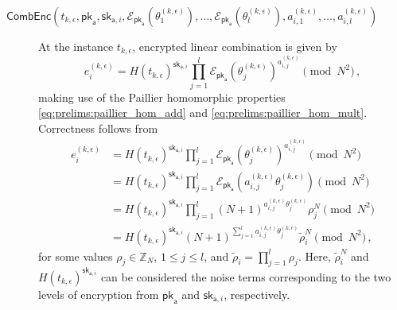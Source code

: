 \begin{description}
    \item[$\mathsf{CombEnc}(t_{k,\epsilon}, \mathsf{pk}_{\mathsf{a}}, \mathsf{sk}_{\mathsf{a},i}, \mathcal{E}_{\mathsf{pk}_{\mathsf{a}}}(\theta_1^{(k,\epsilon)}),\dots,\mathcal{E}_{\mathsf{pk}_{\mathsf{a}}}(\theta_l^{(k,\epsilon)}), a^{(k,\epsilon)}_{i,1},\dots,a^{(k,\epsilon)}_{i,l})$] At the instance $t_{k,\epsilon}$, encrypted linear combination is given by 
    \begin{equation}\label{eq:nonlin_fusion:lca_scheme_lin_comb}
        e^{(k,\epsilon)}_i = H(t_{k,\epsilon})^{\mathsf{sk}_{\mathsf{a},i}}\prod^{l}_{j=1}\mathcal{E}_{\mathsf{pk}_{\mathsf{a}}}(\theta^{(k,\epsilon)}_j)^{a^{(k,\epsilon)}_{i,j}} \pmod{N^2}\,,
    \end{equation}
    making use of the Paillier homomorphic properties \eqref{eq:prelims:paillier_hom_add} and \eqref{eq:prelims:paillier_hom_mult}. Correctness follows from
    \begin{equation*}
        \begin{split}
            e^{(k,\epsilon)}_i &= H(t_{k,\epsilon})^{\mathsf{sk}_{\mathsf{a},i}}\prod^{l}_{j=1}\mathcal{E}_{\mathsf{pk}_{\mathsf{a}}}(\theta^{(k,\epsilon)}_j)^{a^{(k,\epsilon)}_{i,j}} \pmod{N^2} \\
            &= H(t_{k,\epsilon})^{\mathsf{sk}_{\mathsf{a},i}}\prod^{l}_{j=1}\mathcal{E}_{\mathsf{pk}_{\mathsf{a}}}(a^{(k,\epsilon)}_{i,j}\theta^{(k,\epsilon)}_j) \pmod{N^2} \\
            &= H(t_{k,\epsilon})^{\mathsf{sk}_{\mathsf{a},i}}\prod^{l}_{j=1}(N+1)^{a^{(k,\epsilon)}_{i,j}\theta^{(k,\epsilon)}_j} \rho^{N}_{j} \pmod{N^2} \\
            &= H(t_{k,\epsilon})^{\mathsf{sk}_{\mathsf{a},i}}(N+1)^{\sum^{l}_{j=1}a^{(k,\epsilon)}_{i,j}\theta^{(k,\epsilon)}_j} \tilde{\rho}_{i}^{N} \pmod{N^2}\,,
        \end{split}
    \end{equation*}
    for some values $\rho_j \in \mathbb{Z}_N$, $1\leq j\leq l$, and $\tilde{\rho}_i=\prod^{l}_{j=1}\rho_j$. Here, $\tilde{\rho}_i^N$ and $H(t_{k,\epsilon})^{\mathsf{sk}_{\mathsf{a}, i}}$ can be considered the noise terms corresponding to the two levels of encryption from $\mathsf{pk}_{\mathsf{a}}$ and $\mathsf{sk}_{\mathsf{a}, i}$, respectively.


\end{description}
